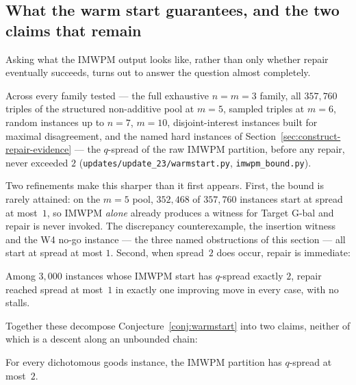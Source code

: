 \subsection{What the warm start guarantees, and the two claims that remain}
\label{sec:approach6-imwpm}

Asking what the IMWPM output looks like, rather than only whether repair
eventually succeeds, turns out to answer the question almost completely.

\begin{observation}
\label{obs:imwpm-two}
Across every family tested --- the full exhaustive $n=m=3$ family, all
$357{,}760$ triples of the structured non-additive pool at $m = 5$, sampled
triples at $m = 6$, random instances up to $n = 7$, $m = 10$,
disjoint-interest instances built for maximal disagreement, and the named hard
instances of Section~\ref{sec:construct-repair-evidence} --- the $q$-spread of
the raw IMWPM partition, before any repair, never exceeded $2$
(\texttt{updates/update\_23/warmstart.py}, \texttt{imwpm\_bound.py}).
\end{observation}

Two refinements make this sharper than it first appears. First, the bound is
rarely attained: on the $m = 5$ pool, $352{,}468$ of $357{,}760$ instances start
at spread at most~$1$, so IMWPM \emph{alone} already produces a witness for
Target G-bal and repair is never invoked. The discrepancy counterexample, the
insertion witness and the W4 no-go instance --- the three named obstructions of
this section --- all start at spread at most $1$. Second, when spread~$2$ does
occur, repair is immediate:

\begin{observation}
\label{obs:one-move}
Among $3{,}000$ instances whose IMWPM start has $q$-spread exactly $2$, repair
reached spread at most~$1$ in exactly one improving move in every case, with no
stalls.
\end{observation}

Together these decompose Conjecture~\ref{conj:warmstart} into two claims, neither
of which is a descent along an unbounded chain:

\begin{conjecture}
\label{conj:imwpm-bound}
For every dichotomous goods instance, the IMWPM partition has $q$-spread at
most~$2$.
\end{conjecture}

